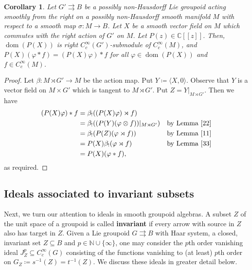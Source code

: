 \documentclass[12pt]{article}
\theoremstyle{plain}
\newtheorem{cor}[thm]{Corollary}
\theoremstyle{definition}
\newcommand{\C}{\mathbb{C}}
\newcommand{\N}{\mathbb{N}}
\newcommand{\dom}{\operatorname{dom}}
\numberwithin{equation}{section}
\begin{document}
\begin{cor}\label{rightlinearity}
Let $G'\rightrightarrows B$ be a possibly non-Hausdorff Lie groupoid acting smoothly from the right on a possibly non-Hausdorff smooth manifold $M$ with respect to a smooth map $\sigma : M \to B$. Let $X$ be a smooth vector field on $M$ which commutes with the right action of $G'$ on $M$. Let $P(z)  \in \C[[z]]$. Then, $\dom(P(X))$ is right $C_c^\infty(G')$-submodule of $C_c^\infty(M)$, and $P(X)(\varphi * f )= (P(X)\varphi)  *f$ for all $\varphi \in \dom(P(X))$ and $f \in C_c^\infty(M)$.
\end{cor}
\begin{proof}
Let $\beta:M \rtimes G' \to M$  be the action map. Put  $Y \coloneqq \langle X,0\rangle$. Observe that $Y$ is a vector field on $M \times G'$  which is tangent to $M \rtimes G'$. Put $Z=Y|_{M \rtimes G'}$. Then we have
\begin{align*}
(P(X) \varphi) * f &=  \beta_!( (P(X) \varphi )\rtimes f) &&\\
&= \beta_!( (P(Y) (\varphi \otimes f))|_{M \rtimes G'}) && \text{by Lemma~\ref{22}} \\
&= \beta_!( P(Z) (\varphi \rtimes f)) && \text{by Lemma~\ref{11}} \\
&= P(X) \beta_!( \varphi \rtimes f)  && \text{by Lemma~\ref{33}} \\
&= P(X) ( \varphi * f), &&
\end{align*}
as required.
\end{proof}







\subsection{Ideals associated to invariant subsets}\label{idealsubection}



Next, we turn our attention to ideals in smooth groupoid algebras. A subset $Z$ of the unit space of a groupoid is called \textbf{invariant} if every arrow with source in $Z$ also has target in $Z$. Given a Lie groupoid $G\rightrightarrows B$ with Haar system, a closed, invariant set $Z \subseteq B$ and $p \in \N\cup\{\infty\}$,  one may consider the  $p$th order vanishing ideal $J_Z^p \subseteq C_c^\infty(G)$ consisting of the functions vanishing to (at least) $p$th order on $G_Z \coloneqq s^{-1}(Z)=t^{-1}(Z)$. We discuss these ideals in greater detail below.
\end{document}
